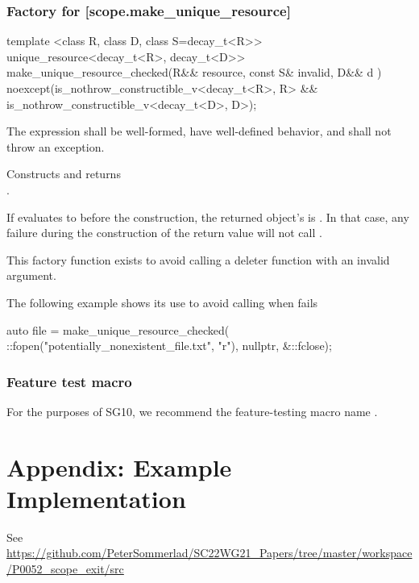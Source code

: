 \documentclass[ebook,11pt,article]{memoir}
\begin{document}
\newpage
\subsection {Factory for  [scope.make_unique_resource]}

\begin{itemdecl}
template <class R, class D, class S=decay_t<R>>
unique_resource<decay_t<R>, decay_t<D>>
make_unique_resource_checked(R&& resource, const S& invalid, D&& d ) 
noexcept(is_nothrow_constructible_v<decay_t<R>, R> &&
         is_nothrow_constructible_v<decay_t<D>, D>);
\end{itemdecl}

\begin{itemdescr}
\pnum
\requires The expression  shall be well-formed, have well-defined behavior, and shall not throw an exception.

\pnum
\effects Constructs and returns \\
. 

\pnum
If  evaluates to  before the construction, the returned  object's  is . 
In that case, any failure during the construction of the return value will not call .

\pnum
\begin{note}
This factory function exists to avoid calling a deleter function with an invalid argument. 
\end{note}

\pnum
\begin{example}
The following example shows its use to avoid calling  when  fails
\begin{codeblock}
auto file = make_unique_resource_checked(
  ::fopen("potentially_nonexistent_file.txt", "r"), 
  nullptr, &::fclose);
\end{codeblock}
\end{example}

\end{itemdescr}


\subsection {Feature test macro}
For the purposes of SG10, we recommend the feature-testing macro name .

\chapter{Appendix: Example Implementation} 
See 
\url{https://github.com/PeterSommerlad/SC22WG21_Papers/tree/master/workspace/P0052_scope_exit/src}
\end{document}
